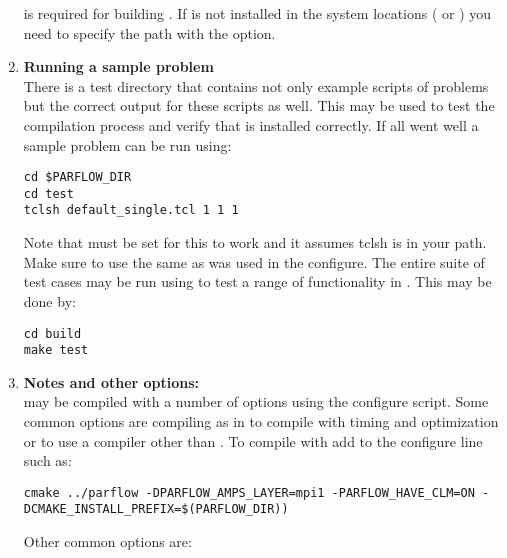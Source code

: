 \begin{enumerate}
 is required for building \parflow{}.  If  is not
installed in the system locations ( or )
you need to specify the path with the
 
option.

\item {\bf Running a sample problem}\\ There is a test directory that
contains not only example scripts of \parflow{} problems but the
correct output for these scripts as well.  This may be used to test
the compilation process and verify that \parflow{} is installed
correctly.  If all went well a sample \parflow{} problem can be run
using:

\begin{display}\begin{verbatim}
cd $PARFLOW_DIR
cd test
tclsh default_single.tcl 1 1 1
\end{verbatim}\end{display}

Note that  must be set for this to work and it
assumes tclsh is in your path.  Make sure to use the same 
as was used in the \cmake{} configure. The entire suite of test
cases may be run using \ctest{} to test a range of functionality in
\parflow{}.  This may be done by:
\begin{display}\begin{verbatim}
cd build
make test
\end{verbatim}\end{display}

\item {\bf Notes and other options:}\\ \parflow{} may be compiled with
a number of options using the configure script.  Some common options
are compiling  as in \cite{MM05,KM08a} to compile with
timing and optimization or to use a compiler other than .
To compile with  add  to the configure
line such as:

\begin{display}\begin{verbatim}
cmake ../parflow -DPARFLOW_AMPS_LAYER=mpi1 -PARFLOW_HAVE_CLM=ON -DCMAKE_INSTALL_PREFIX=$(PARFLOW_DIR)) 
\end{verbatim}\end{display}

Other common options are:


\end{enumerate}
